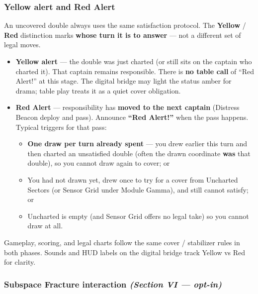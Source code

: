 \documentclass[11pt]{article}
\providecommand{\tightlist}{%
  \setlength{\itemsep}{0pt}\setlength{\parskip}{0pt}}
\begin{document}
\subsubsection{\texorpdfstring{Yellow alert and Red Alert}{Yellow alert and Red Alert}}\label{yellow-alert-and-red-alert-digital-status}

An uncovered double always uses the same satisfaction protocol. The
\textbf{Yellow} / \textbf{Red} distinction marks \textbf{whose turn it is
to answer} --- not a different set of legal moves.

\begin{itemize}
\tightlist
\item
  \textbf{Yellow alert} --- the double was just charted (or still sits on
  the captain who charted it). That captain remains responsible. There is
  \textbf{no table call} of ``Red Alert!'' at this stage. The digital
  bridge may light the status amber for drama; table play treats it as a
  quiet cover obligation.
\item
  \textbf{Red Alert} --- responsibility has \textbf{moved to the next
  captain} (Distress Beacon deploy and pass). Announce \textbf{``Red
  Alert!''} when the pass happens. Typical triggers for that pass:
  \begin{itemize}
  \tightlist
  \item
    \textbf{One draw per turn already spent} --- you drew earlier this
    turn and then charted an unsatisfied double (often the drawn
    coordinate \textbf{was} that double), so you cannot draw again to
    cover; or
  \item
    You had not drawn yet, drew once to try for a cover from Uncharted
    Sectors (or Sensor Grid under Module Gamma), and still cannot
    satisfy; or
  \item
    Uncharted is empty (and Sensor Grid offers no legal take) so you
    cannot draw at all.
  \end{itemize}
\end{itemize}

Gameplay, scoring, and legal charts follow the same cover / stabilizer
rules in both phases. Sounds and HUD labels on the digital bridge track
Yellow vs Red for clarity.

\subsubsection{\texorpdfstring{Subspace Fracture interaction
\emph{(Section VI ---
opt-in)}}{Subspace Fracture interaction (Section VI --- opt-in)}}\label{subspace-fracture-interaction-section-vi--opt-in}
\end{document}
